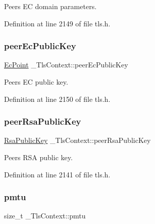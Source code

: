 Peer\textquotesingle{}s EC domain parameters. 



Definition at line 2149 of file tls.\+h.

\mbox{\label{struct__TlsContext_ac3d0697cbd6230af3fa8bd311bc46eb2}} 
\subsubsection{\texorpdfstring{peer\+Ec\+Public\+Key}{peerEcPublicKey}}
{\footnotesize\ttfamily \hyperlink{structEcPoint}{Ec\+Point} \+\_\+\+Tls\+Context\+::peer\+Ec\+Public\+Key}



Peer\textquotesingle{}s EC public key. 



Definition at line 2150 of file tls.\+h.

\mbox{\label{struct__TlsContext_a7dad458ba0a1c14569c6bb4ed574afd8}} 
\subsubsection{\texorpdfstring{peer\+Rsa\+Public\+Key}{peerRsaPublicKey}}
{\footnotesize\ttfamily \hyperlink{structRsaPublicKey}{Rsa\+Public\+Key} \+\_\+\+Tls\+Context\+::peer\+Rsa\+Public\+Key}



Peer\textquotesingle{}s R\+SA public key. 



Definition at line 2141 of file tls.\+h.

\mbox{\label{struct__TlsContext_a08e3d48a5375ee7989a211cda75a8258}} 
\subsubsection{\texorpdfstring{pmtu}{pmtu}}
{\footnotesize\ttfamily size\+\_\+t \+\_\+\+Tls\+Context\+::pmtu}



